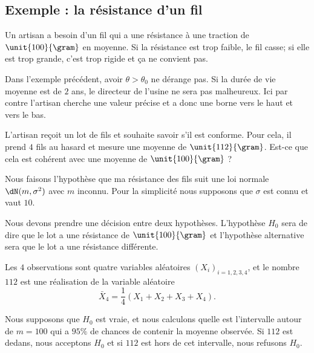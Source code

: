 \subsection{Exemple : la résistance d'un fil}
\label{subsecExempLFilResituzz}

Un artisan a besoin d'un fil qui a une résistance à une traction de \( \unit{100}{\gram}\) en moyenne. Si la résistance est trop faible, le fil casse; si elle est trop grande, c'est trop rigide et ça ne convient pas.

\begin{remark}
    Dans l'exemple précédent, avoir \( \theta>\theta_0\) ne dérange pas. Si la durée de vie moyenne est de \( 2\) ans, le directeur de l'usine ne sera pas malheureux. Ici par contre l'artisan cherche une valeur précise et a donc une borne vers le haut et vers le bas.
\end{remark}

L'artisan reçoit un lot de fils et souhaite savoir s'il est conforme. Pour cela, il prend \( 4\) fils au hasard et mesure une moyenne de \( \unit{112}{\gram}\). Est-ce que cela est cohérent avec une moyenne de \( \unit{100}{\gram}\) ?

Nous faisons l'hypothèse que ma résistance des fils suit une loi normale \( \dN(m,\sigma^2)\) avec \( m\) inconnu. Pour la simplicité nous supposons que \( \sigma\) est connu et vaut \( 10\).

Nous devons prendre une décision entre deux hypothèses. L'hypothèse \( H_0\) sera de dire que le lot a une résistance de \( \unit{100}{\gram}\) et l'hypothèse alternative sera que le lot a une résistance différente.

Les \( 4\) observations sont quatre variables aléatoires \( (X_i)_{i=1,2,3,4}\), et le nombre \( 112\) est une réalisation de la variable aléatoire
\begin{equation}
    \bar X_4=\frac{1}{ 4 }(X_1+X_2+X_3+X_4).
\end{equation}

Nous supposons que \( H_0\) est vraie, et nous calculons quelle est l'intervalle autour de \( m=100\) qui a \( 95\%\) de chances de contenir la moyenne observée. Si \( 112\) est dedans, nous acceptons \( H_0\) et si \( 112\) est hors de cet intervalle, nous refusons \( H_0\).

